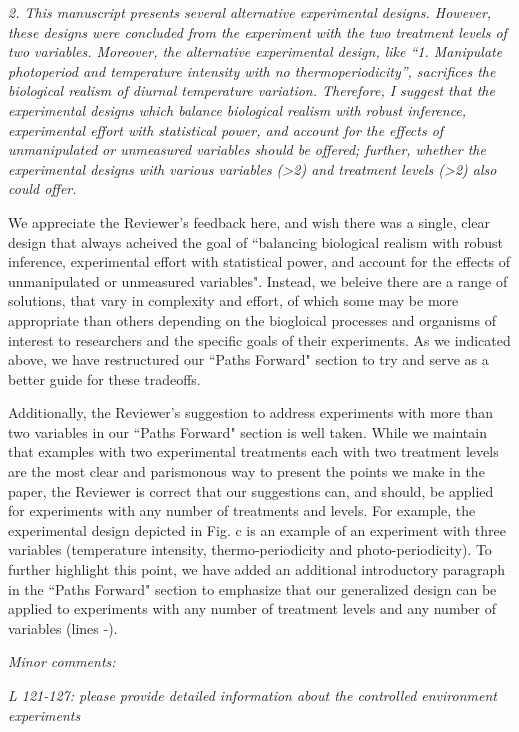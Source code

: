 \documentclass[11pt]{article}
\begin{document}
\emph{2. This manuscript presents several alternative experimental designs. However, these designs were concluded from the experiment with the two treatment levels of two variables. Moreover, the alternative experimental design, like “1. Manipulate photoperiod and temperature intensity with no thermoperiodicity”, sacrifices the biological realism of diurnal temperature variation. Therefore, I suggest that the experimental designs which balance biological realism with robust inference, experimental effort with statistical power, and account for the effects of unmanipulated or unmeasured variables should be offered; further, whether the experimental designs with various variables (>2) and treatment levels (>2) also could offer.}

We appreciate the Reviewer's feedback here, and wish there was a single, clear design that always acheived the goal of ``balancing biological realism with robust inference, experimental effort with statistical power, and account for the effects of unmanipulated or unmeasured variables". Instead, we beleive there are a range of solutions, that vary in complexity and effort, of which some may be more appropriate than others depending on the biogloical processes and organisms of interest to researchers and the specific goals of their experiments. As we indicated above, we have restructured our ``Paths Forward" section to try and serve as a better guide for these tradeoffs.

Additionally, the Reviewer's suggestion to address experiments with more than two variables in our ``Paths Forward" section is well taken. While we maintain that examples with two experimental treatments each with two treatment levels are the most clear and parismonous way to present the points we make in the paper, the Reviewer is correct that our suggestions can, and should, be applied for experiments with any number of treatments and levels. For example, the experimental design depicted in Fig. \label{fig:designs}c is an example of an experiment with three variables (temperature intensity, thermo-periodicity and photo-periodicity). To further highlight this point, we have added an additional introductory paragraph in the ``Paths Forward" section  to emphasize that our generalized design can be applied to experiments with any number of treatment levels and any number of variables (lines -).

\emph{Minor comments:}

\emph{L 121-127: please provide detailed information about the controlled environment experiments}
\end{document}
